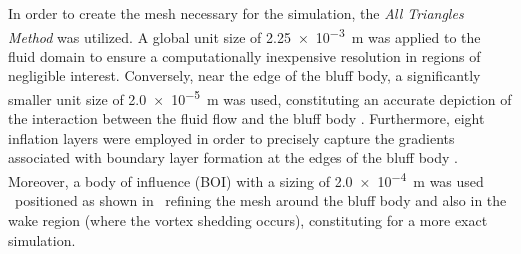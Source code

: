 In order to create the mesh necessary for the simulation, the \textit{All Triangles Method} was utilized. A global unit size of \SI{2.25e-3}{\meter} was applied to the fluid domain to ensure a computationally inexpensive resolution in regions of negligible interest. Conversely, near the edge of the bluff body, a significantly smaller unit size of \SI{2.0e-5}{\meter} was used, constituting an accurate depiction of the interaction between the fluid flow and the bluff body \parencite{ansys_learning_best_2023}. Furthermore, eight inflation layers were employed in order to precisely capture the gradients associated with boundary layer formation at the edges of the bluff body \parencite{fluid_mechanics_101_cfd_2021}. Moreover, a body of influence (BOI) with a sizing of \SI{2.0e-4}{\meter} was used \textemdash\ positioned as shown in  \textemdash\ refining the mesh around the bluff body and also in the wake region (where the vortex shedding occurs), constituting for a more exact simulation.


